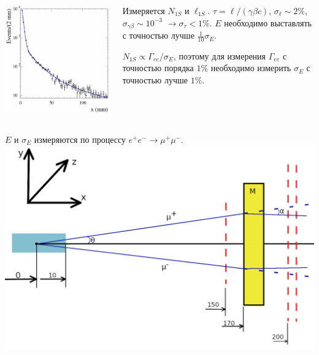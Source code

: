 \documentclass[10pt, pdf, hyperref={unicode}]{beamer}
\begin{document}
\begin{frame}
	\begin{minipage}{\linewidth}
		\begin{columns}[T]
			\begin{column}{0.5\linewidth}
				\includegraphics[scale = 0.5]{flight.png}
			\end{column}

			\begin{column}{0.5\linewidth}
				\fontsize{12pt}{20}\selectfont
				Измеряется $N_{1S}$ и $\ell_{1S}$.
				$\tau = \ell/(\gamma\beta c)$, $\sigma_{\ell} \sim 2\%$, $\sigma_{\gamma\beta} \sim 10^{-3}$
				$\rightarrow \sigma_{\tau} < 1\%$. $E$  необходимо выставлять с точностью лучше $\frac{1}{10}\sigma_E$.

				$N_{1S} \propto \Gamma_{ee}/\sigma_E$, поэтому для измерения $\Gamma_{ee}$
				с точностью порядка $1\%$ необходимо измерить $\sigma_E$ с точностью лучше $1\%$.
			\end{column}
		\end{columns}
	\end{minipage}
\end{frame}

\begin{frame}
	\centering
	$E$ и $\sigma_E$ измеряются по процессу $e^+e^- \rightarrow \mu^+\mu^-$.
	\includegraphics[width = 0.9\linewidth]{spectr.png}
	\par
\end{frame}
\end{document}
